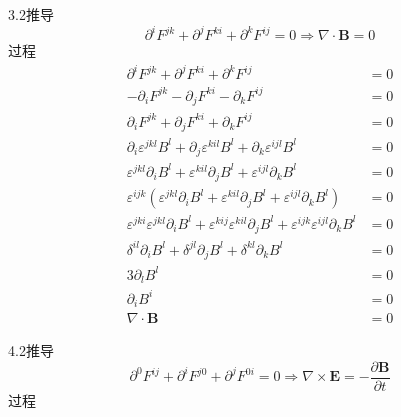 3.2推导
\begin{equation}
    \partial ^iF^{jk}+\partial ^jF^{ki}+\partial ^kF^{ij}=0\Rightarrow \nabla \cdot \mathbf{B}=0
\end{equation}
过程
\begin{equation}
    \begin{aligned}
        \partial ^iF^{jk}+\partial ^jF^{ki}+\partial ^kF^{ij}&=0
\\
-\partial _iF^{jk}-\partial _jF^{ki}-\partial _kF^{ij}&=0
\\
\partial _iF^{jk}+\partial _jF^{ki}+\partial _kF^{ij}&=0
\\
\partial _i\varepsilon ^{jkl}B^l+\partial _j\varepsilon ^{kil}B^l+\partial _k\varepsilon ^{ijl}B^l&=0
\\
\varepsilon ^{jkl}\partial _iB^l+\varepsilon ^{kil}\partial _jB^l+\varepsilon ^{ijl}\partial _kB^l&=0
\\
\varepsilon ^{ijk}\left( \varepsilon ^{jkl}\partial _iB^l+\varepsilon ^{kil}\partial _jB^l+\varepsilon ^{ijl}\partial _kB^l \right) &=0
\\
\varepsilon ^{jki}\varepsilon ^{jkl}\partial _iB^l+\varepsilon ^{kij}\varepsilon ^{kil}\partial _jB^l+\varepsilon ^{ijk}\varepsilon ^{ijl}\partial _kB^l&=0
\\
\delta ^{il}\partial _iB^l+\delta ^{jl}\partial _jB^l+\delta ^{kl}\partial _kB^l&=0
\\
3\partial _lB^l&=0
\\
\partial _iB^i&=0
\\
\nabla \cdot \mathbf{B}&=0
    \end{aligned}
\end{equation}







4.2推导
\begin{equation}
    \partial ^0F^{ij}+\partial ^iF^{j0}+\partial ^jF^{0i}=0\Rightarrow \nabla \times \mathbf{E}=-\frac{\partial \mathbf{B}}{\partial t}
\end{equation}
过程
\begin{equation}
    \begin{aligned}
        
    \end{aligned}
\end{equation}








\subsection{}


















